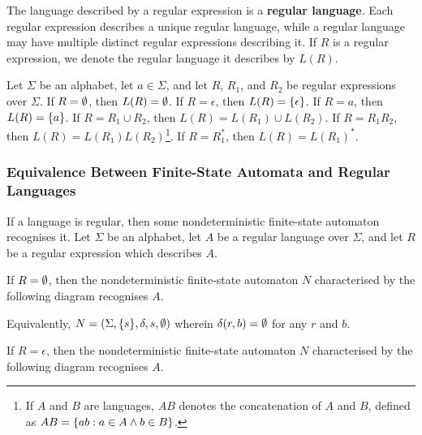 The language described by a regular expression is a {\bf regular language}. Each
regular expression describes a unique regular language, while a regular language
may have multiple distinct regular expressions describing it. If \(R\) is a
regular expression, we denote the regular language it describes by \(L(R)\).

Let \(\Sigma\) be an alphabet, let \(a \in \Sigma\), and let \(R\), \(R_1\), and
\(R_2\) be regular expressions over \(\Sigma\). If \(R = \emptyset\), then \(L(R) =
\emptyset\). If \(R = \epsilon\), then \(L(R) = \{\epsilon\}\). If \(R = a\), then
\(L(R) = \{a\}\). If \(R = R_1 \cup R_2\), then \(L(R) = L(R_1) \cup L(R_2)\).
If \(R = R_1 R_2\), then \(L(R) = L(R_1) L(R_2)\)\footnote{If \(A\) and \(B\)
are languages, \(A B\) denotes the concatenation of \(A\) and \(B\), defined
as \(A B = \{a b : a \in A \land b \in B\}\).}. If \(R = R_1^*\), then \(L(R) =
L(R_1)^*\).

\subsubsection{Equivalence Between Finite-State Automata and Regular Languages}

\Blm
    \label{lem1}
    If a language is regular, then some nondeterministic finite-state automaton
    recognises it.
\Elm
\Bpr
    Let \(\Sigma\) be an alphabet, let \(A\) be a regular language over
    \(\Sigma\), and let \(R\) be a regular expression which describes \(A\).

    If \(R = \emptyset\), then the nondeterministic finite-state automaton \(N\)
    characterised by the following diagram recognises \(A\).
    \begin{figure}[!h]
        \centering
    \end{figure}

    \noindent Equivalently, \(N = (\Sigma, \{s\}, \delta, s, \emptyset)\) wherein
    \(\delta(r, b) = \emptyset\) for any \(r\) and \(b\).

    If \(R = \epsilon\), then the nondeterministic finite-state automaton \(N\)
    characterised by the following diagram recognises \(A\).
    \begin{figure}[!h]
        \centering
    \end{figure}


